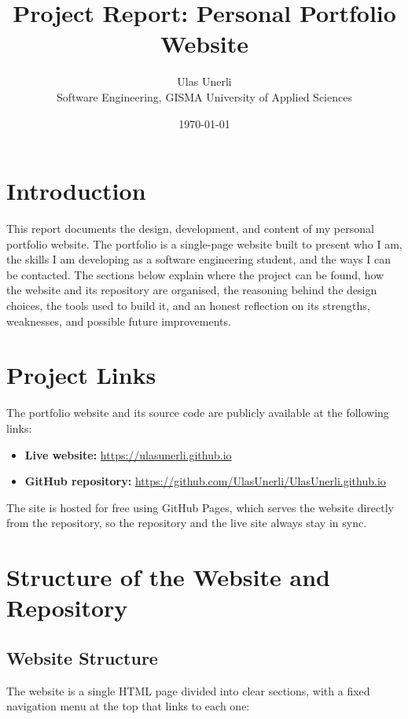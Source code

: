 \documentclass[11pt,a4paper]{article}
\title{Project Report: Personal Portfolio Website}
\author{Ulas Unerli\\ Software Engineering, GISMA University of Applied Sciences}
\date{\today}
\begin{document}
\maketitle
\thispagestyle{empty}

\section{Introduction}
This report documents the design, development, and content of my personal
portfolio website. The portfolio is a single-page website built to present
who I am, the skills I am developing as a software engineering student, and
the ways I can be contacted. The sections below explain where the project can
be found, how the website and its repository are organised, the reasoning
behind the design choices, the tools used to build it, and an honest reflection
on its strengths, weaknesses, and possible future improvements.

\section{Project Links}
The portfolio website and its source code are publicly available at the
following links:

\begin{itemize}
  \item \textbf{Live website:}
    \href{https://ulasunerli.github.io}{https://ulasunerli.github.io}
  \item \textbf{GitHub repository:}
    \href{https://github.com/UlasUnerli/UlasUnerli.github.io}{https://github.com/UlasUnerli/UlasUnerli.github.io}
\end{itemize}

The site is hosted for free using GitHub Pages, which serves the website
directly from the repository, so the repository and the live site always
stay in sync.

\section{Structure of the Website and Repository}

\subsection{Website Structure}
The website is a single HTML page divided into clear sections, with a fixed
navigation menu at the top that links to each one:
\end{document}
